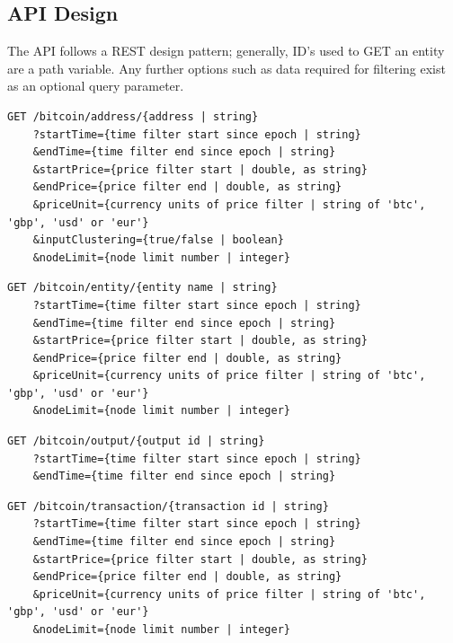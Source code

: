 \subsection{API Design}
The API follows a REST design pattern; generally, ID's used to GET an entity are a path variable. Any further options such as data required for filtering exist as an optional query parameter.  

\begin{lstlisting}[label={lst:address-api}, caption={Get an address using the unique full address. Several optional query parameters for filtering by time, price and enabling clustering and node limiting. \\[0.5cm] }, breaklines=true, basicstyle=\small]
GET /bitcoin/address/{address | string}
    ?startTime={time filter start since epoch | string}
    &endTime={time filter end since epoch | string}
    &startPrice={price filter start | double, as string}
    &endPrice={price filter end | double, as string}
    &priceUnit={currency units of price filter | string of 'btc', 'gbp', 'usd' or 'eur'}
    &inputClustering={true/false | boolean}
    &nodeLimit={node limit number | integer}
\end{lstlisting}

\begin{lstlisting}[caption={Get an entity using the unique name of the entity . All query parameters are optional for filtering.}, breaklines=true, basicstyle=\small]
GET /bitcoin/entity/{entity name | string}
    ?startTime={time filter start since epoch | string}
    &endTime={time filter end since epoch | string}
    &startPrice={price filter start | double, as string}
    &endPrice={price filter end | double, as string}
    &priceUnit={currency units of price filter | string of 'btc', 'gbp', 'usd' or 'eur'}
    &nodeLimit={node limit number | integer}
\end{lstlisting}

\begin{lstlisting}[caption={Get an output with a unique output ID. All query parameters are optional for filtering.}, breaklines=true, basicstyle=\small]
GET /bitcoin/output/{output id | string}
    ?startTime={time filter start since epoch | string}
    &endTime={time filter end since epoch | string}
\end{lstlisting}

\begin{lstlisting}[caption={Get a transaction with a unique transaction ID (txid). All query parameters are optional for filtering.}, breaklines=true, basicstyle=\small]
GET /bitcoin/transaction/{transaction id | string}
    ?startTime={time filter start since epoch | string}
    &endTime={time filter end since epoch | string}
    &startPrice={price filter start | double, as string}
    &endPrice={price filter end | double, as string}
    &priceUnit={currency units of price filter | string of 'btc', 'gbp', 'usd' or 'eur'}
    &nodeLimit={node limit number | integer}
\end{lstlisting}

